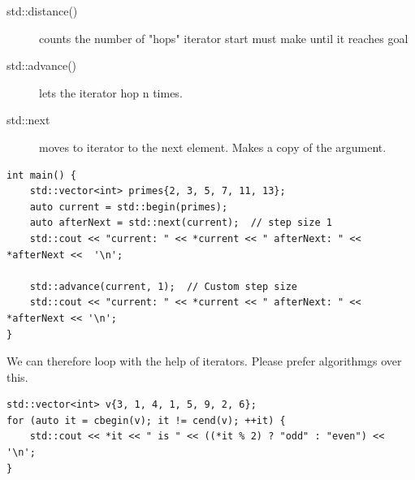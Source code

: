 \begin{description}
	\item [std::distance()] counts the number of "hops" iterator start must make until it reaches goal
	\item [std::advance()] lets the iterator hop n times.
	\item [std::next] moves to iterator to the next element. Makes a copy of the argument.
\end{description}

\begin{lstlisting}
int main() {
	std::vector<int> primes{2, 3, 5, 7, 11, 13};
	auto current = std::begin(primes); 
	auto afterNext = std::next(current);  // step size 1
	std::cout << "current: " << *current << " afterNext: " << *afterNext <<  '\n';
	
	std::advance(current, 1);  // Custom step size
	std::cout << "current: " << *current << " afterNext: " << *afterNext << '\n';
}
\end{lstlisting}

We can therefore loop with the help of iterators. Please prefer algorithmgs over this.
\begin{lstlisting}
std::vector<int> v{3, 1, 4, 1, 5, 9, 2, 6}; 
for (auto it = cbegin(v); it != cend(v); ++it) {
	std::cout << *it << " is " << ((*it % 2) ? "odd" : "even") << '\n'; 
}
\end{lstlisting}

